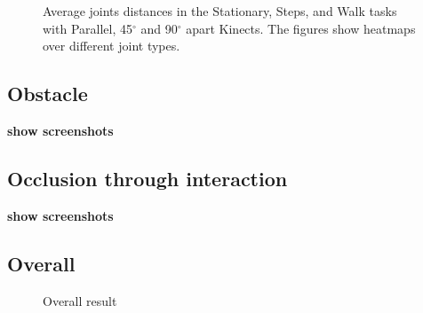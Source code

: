 \begin{figure*}[!htb]
  \centering

  \subfloat[Stationary]{
     
    
    
  } \\
  \subfloat[Steps]{
     
    
    
  } \\
  \subfloat[Walk]{
     
    
    
  }

  \caption{Average joints distances in the Stationary, Steps, and Walk tasks with Parallel, 45$^{\circ}$ and 90$^{\circ}$ apart Kinects. The figures show heatmaps over different joint types.}

  \label{fig:results_three_joints_over_time}
\end{figure*}
\FloatBarrier

\subsection{Obstacle}

\textbf{show screenshots}

\subsection{Occlusion through interaction}

\textbf{show screenshots}

\subsection{Overall}

\begin{figure*}[!htb]
  \centering

  

  \caption{Overall result}

  \label{fig:results_overall}
\end{figure*}

